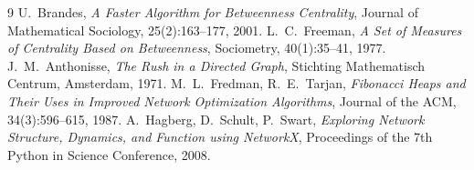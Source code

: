 \documentclass[11pt,a4paper]{report}
\begin{document}
\begin{thebibliography}{9}
	 U.~Brandes,
	\emph{A Faster Algorithm for Betweenness Centrality},
	Journal of Mathematical Sociology, 25(2):163--177, 2001.
	 L.~C.~Freeman,
	\emph{A Set of Measures of Centrality Based on Betweenness},
	Sociometry, 40(1):35--41, 1977.
	 J.~M.~Anthonisse,
	\emph{The Rush in a Directed Graph},
	Stichting Mathematisch Centrum, Amsterdam, 1971.
	 M.~L.~Fredman, R.~E.~Tarjan,
	\emph{Fibonacci Heaps and Their Uses in Improved Network Optimization Algorithms},
	Journal of the ACM, 34(3):596--615, 1987.
	 A.~Hagberg, D.~Schult, P.~Swart,
	\emph{Exploring Network Structure, Dynamics, and Function using NetworkX},
	Proceedings of the 7th Python in Science Conference, 2008.
\end{thebibliography}
\end{document}
